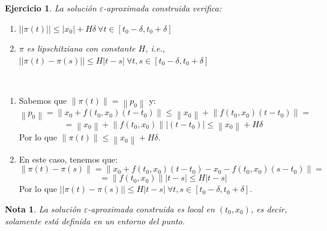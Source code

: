 \documentclass[11pt, a4paper,twoside]{article}
\makeatletter
\theoremstyle{theorem-style}  %
\renewenvironment{proof}[1][\proofname]{\par
	\pushQED{\qed}%
	\normalfont \topsep6\p@\@plus6\p@\relax
	\list{}{%
		\settowidth{\leftmargin}{\quad:\hskip\labelsep}%
		\setlength{\labelwidth}{0pt}%
		\setlength{\itemindent}{-\leftmargin}%
	}%
	\item[\hskip\labelsep\itshape#1\@addpunct{:}]\ignorespaces
}{%
	\popQED\endlist\@endpefalse
}
\theoremstyle{definition-style}
\newtheorem*{note}{Nota} %
\theoremstyle{example-style}
\newtheorem{exercise}{Ejercicio}[section]
\providecommand{\norm}[1]{\left\lVert#1\right\rVert} %
\providecommand{\abs}[1]{\left\lvert#1\right\rvert} %
\makeatother
\begin{document}
\begin{exercise}
	La solución  $ \varepsilon $-aproximada construida verifica:
	\begin{enumerate}[\quad 1)]
		\item $ ||\pi(t)||\leq |x_0|+H\delta \ \forall t \in [t_0-\delta,t_0+\delta]$
		\item $ \pi $ es lipschitziana con constante $ H $, i.e., $ ||\pi(t)- \pi(s)|| \leq H |t-s| \ \forall t,s \in [t_0-\delta, t_0+\delta] $
	\end{enumerate}
\end{exercise}
\begin{proof}[Solución:]\ 
	\begin{enumerate}[\quad 1)]
		\item Sabemos que $\norm{\pi (t)} = \norm{p_0}$ y:
		\[\norm{p_0} = \norm{x_0 + f(t_0, x_0) (t - t_0)} \leq \norm{x_0} + \norm{f(t_0, x_0) (t - t_0)} = \]
		\[= \norm{x_0} + \norm{f(t_0, x_0)} \abs{(t - t_0)} \leq \norm{x_0} + H\delta\]
		Por lo que $\norm{\pi (t)} \leq \norm{x_0} + H\delta$.
		\item En este caso, tenemos que:
		\[\norm{\pi (t) - \pi (s)} = \norm{x_0 + f(t_0, x_0) (t - t_0) - x_0 - f(t_0, x_0) (s - t_0)} =\]
		\[= \norm{f(t_0, x_0)} \abs{t - s} \leq H\abs{t - s}\]
		Por lo que $ ||\pi(t)- \pi(s)|| \leq H |t-s| \ \forall t,s \in [t_0-\delta, t_0+\delta]$.
	\end{enumerate}
\end{proof}
\begin{note}
	La solución $ \varepsilon $-aproximada construida es local en $ (t_0,x_0) $, es decir, solamente está definida en un entorno del punto.
\end{note}
\end{document}
